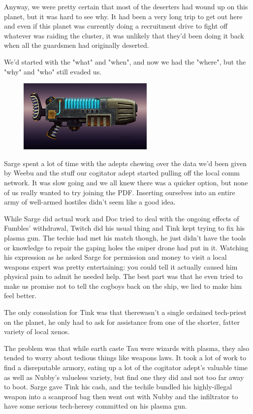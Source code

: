 Anyway, we were pretty certain that most of the deserters had wound up on this planet, but it was hard to see why. 
It had been a very long trip to get out here and even if this planet was currently doing a recruitment drive to fight off whatever was raiding the cluster, it was unlikely that they'd been doing it back when all the guardsmen had originally deserted. 


We'd started with the "what" and "when", and now we had the "where", but the "why" and "who" still evaded us.

\begin{figure}
	\begin{center}
		\includegraphics[width=\figwidth]{pics/10/38.png}
	\end{center}
\end{figure}
Sarge spent a lot of time with the adepts chewing over the data we'd been given by Weebu and the stuff our cogitator adept started pulling off the local comm network. 
It was slow going and we all knew there was a quicker option, but none of us really wanted to try joining the PDF. 
Inserting ourselves into an entire army of well-armed hostiles didn't seem like a good idea.

While Sarge did actual work and Doc tried to deal with the ongoing effects of Fumbles' withdrawal, Twitch did his usual thing and Tink kept trying to fix his plasma gun. 
The techie had met his match though, he just didn't have the tools or knowledge to repair the gaping holes the sniper drone had put in it. 
Watching his expression as he asked Sarge for permission and money to visit a local weapons expert was pretty entertaining: 
you could tell it actually caused him physical pain to admit he needed help. 
The best part was that he even tried to make us promise not to tell the cogboys back on the ship, we lied to make him feel better. 


The only consolation for Tink was that therewasn't a single ordained tech-priest on the planet, he only had to ask for assistance from one of the shorter, fatter variety of local xenos. 


The problem was that while earth caste Tau were wizards with plasma, they also tended to worry about tedious things like weapons laws. 
It took a lot of work to find a disreputable armory, eating up a lot of the cogitator adept's valuable time as well as Nubby's valueless variety, but find one they did and not too far away to boot. 
Sarge gave Tink his cash, and the techile bundled his highly-illegal weapon into a scanproof bag then went out with Nubby and the infiltrator to have some serious tech-heresy committed on his plasma gun.

